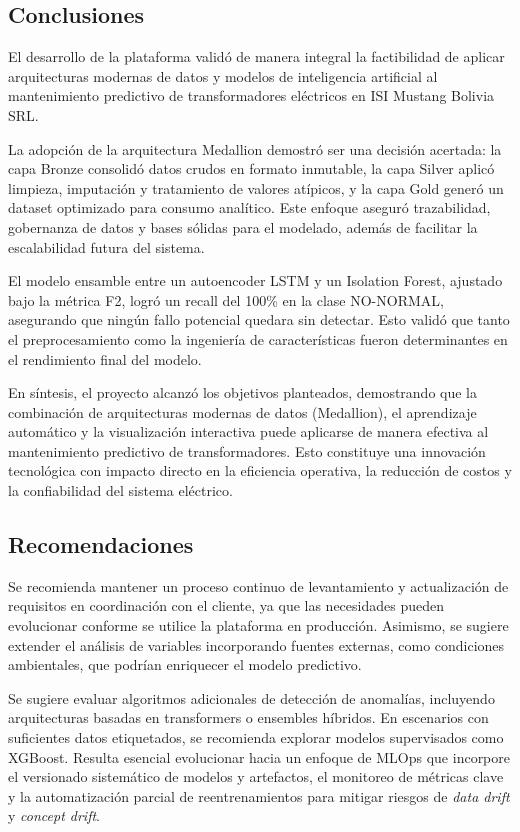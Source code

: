 \documentclass{univalle-perfil}
\begin{document}
\subsection{Conclusiones}

El desarrollo de la plataforma validó de manera integral la factibilidad de aplicar
arquitecturas modernas de datos y modelos de inteligencia artificial al mantenimiento
predictivo de transformadores eléctricos en ISI Mustang Bolivia SRL.

La adopción de la arquitectura Medallion demostró ser una decisión acertada: la capa
Bronze consolidó datos crudos en formato inmutable, la capa Silver aplicó limpieza,
imputación y tratamiento de valores atípicos, y la capa Gold generó un dataset
optimizado para consumo analítico. Este enfoque aseguró trazabilidad, gobernanza
de datos y bases sólidas para el modelado, además de facilitar la escalabilidad
futura del sistema.

El modelo ensamble entre un autoencoder LSTM y un Isolation Forest, ajustado bajo
la métrica F2, logró un recall del 100\% en la clase NO-NORMAL, asegurando que
ningún fallo potencial quedara sin detectar. Esto validó que tanto el preprocesamiento
como la ingeniería de características fueron determinantes en el rendimiento final del
modelo.

En síntesis, el proyecto alcanzó los objetivos planteados, demostrando que la
combinación de arquitecturas modernas de datos (Medallion), el aprendizaje
automático y la visualización interactiva puede aplicarse de manera efectiva al
mantenimiento predictivo de transformadores. Esto constituye una innovación
tecnológica con impacto directo en la eficiencia operativa, la reducción de costos y
la confiabilidad del sistema eléctrico.

\subsection{Recomendaciones}

Se recomienda mantener un proceso continuo de levantamiento y actualización de
requisitos en coordinación con el cliente, ya que las necesidades pueden evolucionar
conforme se utilice la plataforma en producción. Asimismo, se sugiere extender el
análisis de variables incorporando fuentes externas, como condiciones ambientales,
que podrían enriquecer el modelo predictivo.

Se sugiere evaluar algoritmos adicionales de detección de anomalías, incluyendo
arquitecturas basadas en transformers o ensembles híbridos. En escenarios con
suficientes datos etiquetados, se recomienda explorar modelos supervisados como
XGBoost. Resulta esencial evolucionar hacia un enfoque de MLOps que incorpore el
versionado sistemático de modelos y artefactos, el monitoreo de métricas clave y la
automatización parcial de reentrenamientos para mitigar riesgos de \textit{data drift}
y \textit{concept drift}.
\end{document}
